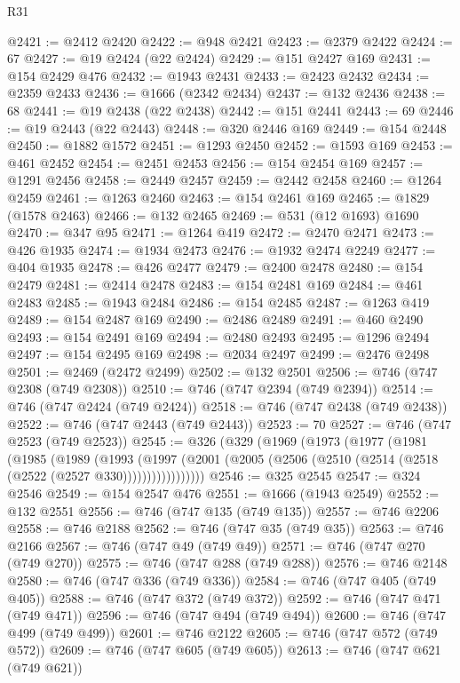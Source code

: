 \begin{lexlean}{R31}
\begin{coremodule}
@2421 := @2412 @2420
@2422 := @948 @2421
@2423 := @2379 @2422
@2424 := 67
@2427 := @19 @2424 (@22 @2424)
@2429 := @151 @2427 @169
@2431 := @154 @2429 @476
@2432 := @1943 @2431
@2433 := @2423 @2432
@2434 := @2359 @2433
@2436 := @1666 (@2342 @2434)
@2437 := @132 @2436
@2438 := 68
@2441 := @19 @2438 (@22 @2438)
@2442 := @151 @2441
@2443 := 69
@2446 := @19 @2443 (@22 @2443)
@2448 := @320 @2446 @169
@2449 := @154 @2448
@2450 := @1882 @1572
@2451 := @1293 @2450
@2452 := @1593 @169
@2453 := @461 @2452
@2454 := @2451 @2453
@2456 := @154 @2454 @169
@2457 := @1291 @2456
@2458 := @2449 @2457
@2459 := @2442 @2458
@2460 := @1264 @2459
@2461 := @1263 @2460
@2463 := @154 @2461 @169
@2465 := @1829 (@1578 @2463)
@2466 := @132 @2465
@2469 := @531 (@12 @1693) @1690
@2470 := @347 @95
@2471 := @1264 @419
@2472 := @2470 @2471
@2473 := @426 @1935
@2474 := @1934 @2473
@2476 := @1932 @2474 @2249
@2477 := @404 @1935
@2478 := @426 @2477
@2479 := @2400 @2478
@2480 := @154 @2479
@2481 := @2414 @2478
@2483 := @154 @2481 @169
@2484 := @461 @2483
@2485 := @1943 @2484
@2486 := @154 @2485
@2487 := @1263 @419
@2489 := @154 @2487 @169
@2490 := @2486 @2489
@2491 := @460 @2490
@2493 := @154 @2491 @169
@2494 := @2480 @2493
@2495 := @1296 @2494
@2497 := @154 @2495 @169
@2498 := @2034 @2497
@2499 := @2476 @2498
@2501 := @2469 (@2472 @2499)
@2502 := @132 @2501
@2506 := @746 (@747 @2308 (@749 @2308))
@2510 := @746 (@747 @2394 (@749 @2394))
@2514 := @746 (@747 @2424 (@749 @2424))
@2518 := @746 (@747 @2438 (@749 @2438))
@2522 := @746 (@747 @2443 (@749 @2443))
@2523 := 70
@2527 := @746 (@747 @2523 (@749 @2523))
@2545 := @326
    (@329
      (@1969
        (@1973
          (@1977
            (@1981
              (@1985
                (@1989
                  (@1993
                    (@1997
                      (@2001 (@2005 (@2506 (@2510 (@2514 (@2518 (@2522 (@2527 @330)))))))))))))))))
@2546 := @325 @2545
@2547 := @324 @2546
@2549 := @154 @2547 @476
@2551 := @1666 (@1943 @2549)
@2552 := @132 @2551
@2556 := @746 (@747 @135 (@749 @135))
@2557 := @746 @2206
@2558 := @746 @2188
@2562 := @746 (@747 @35 (@749 @35))
@2563 := @746 @2166
@2567 := @746 (@747 @49 (@749 @49))
@2571 := @746 (@747 @270 (@749 @270))
@2575 := @746 (@747 @288 (@749 @288))
@2576 := @746 @2148
@2580 := @746 (@747 @336 (@749 @336))
@2584 := @746 (@747 @405 (@749 @405))
@2588 := @746 (@747 @372 (@749 @372))
@2592 := @746 (@747 @471 (@749 @471))
@2596 := @746 (@747 @494 (@749 @494))
@2600 := @746 (@747 @499 (@749 @499))
@2601 := @746 @2122
@2605 := @746 (@747 @572 (@749 @572))
@2609 := @746 (@747 @605 (@749 @605))
@2613 := @746 (@747 @621 (@749 @621))

\end{coremodule}
\end{lexlean}
